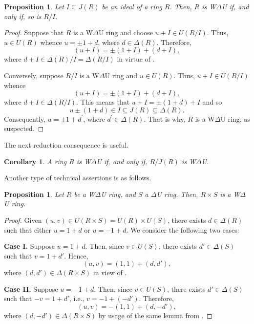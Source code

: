 \documentclass[12pt]{amsart}
\newtheorem{proposition}[theorem]{Proposition}
\newtheorem{corollary}[theorem]{Corollary}
\theoremstyle{definition}
\begin{document}
\begin{proposition}\label{1}
Let \(I \subseteq J(R)\) be an ideal of a ring \(R\). Then, \(R\) is W$\Delta$U if, and only if, so is \(R/I\).
\end{proposition}

\begin{proof}
Suppose that \(R\) is a W$\Delta$U ring and choose \(u + I \in U(R/I)\). Thus, \(u \in U(R)\) whence \(u = \pm1 + d\), where \(d \in \Delta(R)\). Therefore, \[(u + I) = \pm(1+I)+(d+I),\] where \(d + I \in \Delta(R)/I = \Delta(R/I)\) in virtue of \cite[Proposition 6]{2}.
	
Conversely, suppose \(R/I\) is a W$\Delta$U ring and \(u \in U(R)\). Thus, \(u + I \in U(R/I)\) whence \[(u + I) = \pm(1 + I) + (d + I),\] where \(d + I \in \Delta(R/I)\). This means that \(u + I = \pm(1 + d) + I\) and so \[u \pm(1 + d) \in I \subseteq J(R) \subseteq \Delta(R).\] Consequently, \(u = \pm1 + d^\prime\), where \(d^\prime \in \Delta(R)\). That is why, \(R\) is a W$\Delta$U ring, as suspected.
\end{proof}

The next reduction consequence is useful.

\begin{corollary}\label{2}
A ring \(R\) is W$\Delta$U if, and only if, \(R/J(R)\) is W$\Delta$U.
\end{corollary}

Another type of technical assertions is as follows.

\begin{proposition}\label{product}
Let $R$ be a W$\Delta$U ring, and $S$ a $\Delta$U ring. Then, $R\times S$ is a W$\Delta$U ring.
\end{proposition}

\begin{proof}
Given \((u, v) \in U(R \times S) = U(R) \times U(S)\), there exists \( d \in \Delta(R) \) such that either \( u = 1 + d \) or \( u = -1 + d \). We consider the following two cases:

\medskip

\noindent\textbf{Case I.} Suppose \( u = 1 + d \). Then, since \( v \in U(S) \), there exists \( d' \in \Delta(S) \) such that \( v = 1 + d' \). Hence,
\[
(u, v) = (1, 1) + (d, d'),
\]
where \( (d, d') \in \Delta(R \times S) \) in view of \cite[Lemma 1(5)]{2}.

\medskip

\noindent\textbf{Case II.} Suppose \( u = -1 + d \). Then, since \( v \in U(S) \), there exists \( d' \in \Delta(S) \) such that \( -v = 1 + d' \), i.e., \( v = -1 + (-d') \). Therefore,
\[
(u, v) = -(1, 1) + (d, -d'),
\]
where \( (d, -d') \in \Delta(R \times S) \) by usage of the same lemma from \cite{2}.
\end{proof}
\end{document}
